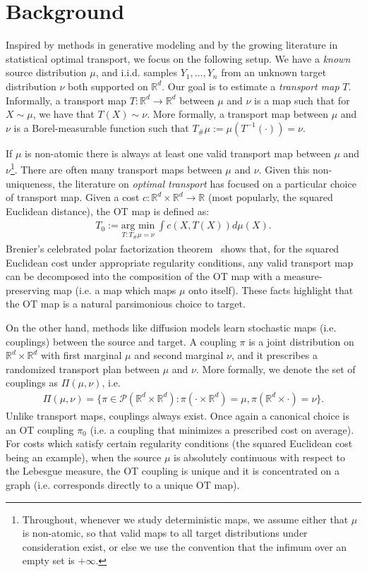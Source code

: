 \documentclass[11pt,twoside]{article}
\begin{document}
\section{Background}
Inspired by methods in generative modeling and by the growing literature in statistical optimal transport, we focus on the following setup. 
We have a \emph{known} source distribution $\mu$, and i.i.d. samples $Y_1, \ldots, Y_n$ from an unknown target distribution $\nu$ both supported on $\mathbb{R}^d$.  Our goal is to estimate a \emph{transport map} $T$. Informally, a transport map $T:\mathbb{R}^d \to \mathbb{R}^d$ between $\mu$ and $\nu$ is a map such that for $X \sim \mu$, we have that $T(X) \sim \nu$. More formally, a transport map between $\mu$ and $\nu$
is a Borel-measurable function such that $T_{\#} \mu := \mu(T^{-1}(\cdot)) = \nu$. 

If $\mu$ is non-atomic 
there is always at least one valid transport map between $\mu$ and $\nu$\footnote{Throughout, whenever we study deterministic maps, we assume either that $\mu$ is non-atomic, 
so that valid maps to all target distributions under consideration exist, or else we use the convention that the infimum over an empty set is $+\infty$.}.
There are often many transport maps between $\mu$ and $\nu$. 
Given this non-uniqueness, the literature on \emph{optimal transport} has focused on a particular choice of transport map. 
Given a cost $c: \mathbb{R}^d \times \mathbb{R}^d \to \mathbb{R}$ (most popularly, the squared Euclidean distance), the OT map is defined as:
\begin{align*}
T_0 := \underset{T: T_{\#} \mu = \nu}{\text{arg min}}~\int c(X,T(X)) d\mu(X). 
\end{align*}
Brenier's celebrated polar factorization theorem~\cite{brenier1991} shows that, for the squared Euclidean cost under appropriate regularity conditions, any valid transport map can be decomposed into the composition of 
the OT map with a measure-preserving map (i.e. a map which maps $\mu$ onto itself). 
These facts highlight that the OT map is a natural parsimonious choice to target.

On the other hand, methods like diffusion models learn stochastic maps (i.e. couplings) between the source and target. A coupling $\pi$ is a joint distribution on $\mathbb{R}^d \times \mathbb{R}^d$ with first marginal $\mu$ and second marginal $\nu$, and it prescribes a randomized transport plan between $\mu$ and $\nu$. More formally, we denote the set of couplings as $\Pi(\mu,\nu)$, i.e.
\begin{align*}
\Pi(\mu,\nu) = \{ \pi \in \mathcal{P}(\mathbb{R}^d \times \mathbb{R}^d): \pi( \cdot \times \mathbb{R}^d) = \mu, \pi( \mathbb{R}^d \times \cdot) = \nu \}.
\end{align*} 
Unlike transport maps, couplings always exist. Once again a canonical choice is an OT coupling $\pi_0$ (i.e. a coupling that minimizes a prescribed cost on average). 
For costs which satisfy certain regularity conditions (the squared Euclidean cost being an example), when the source $\mu$ is absolutely continuous with respect to the Lebesgue measure, the OT coupling is unique and it is concentrated on a graph (i.e. corresponds directly to a unique OT map).
\end{document}

